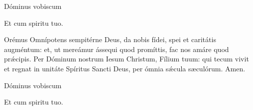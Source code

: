 


\rubric{\Vbar} Dóminus vobiscum

\rubric{\Rbar} Et cum spiritu tuo.

Orémus
Omnípotens sempitérne Deus, da nobis fídei, spei et caritátis augméntum: et, ut mereámur ássequi quod promíttis, fac nos amáre quod prǽcipis. Per Dóminum nostrum Iesum Christum, Fílium tuum: qui tecum vivit et regnat in unitáte Spíritus Sancti Deus, per ómnia sǽcula sæculórum. \rubric{\Rbar} Amen.

\rubric{\Vbar} Dóminus vobiscum

\rubric{\Rbar} Et cum spiritu tuo.
